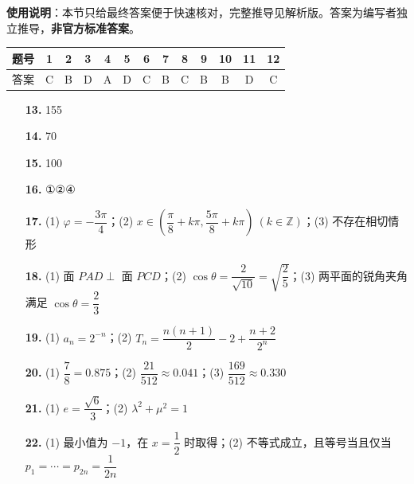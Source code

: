 
\begin{gknotice}
\textbf{使用说明}：本节只给最终答案便于快速核对，完整推导见解析版。答案为编写者独立推导，\textbf{非官方标准答案}。
\end{gknotice}

\begin{center}\begin{tabular}{ccccccccccccc}
\toprule
题号 & 1 & 2 & 3 & 4 & 5 & 6 & 7 & 8 & 9 & 10 & 11 & 12 \\
\midrule
答案 & C & B & D & A & D & C & B & C & B & B & D & C \\
\bottomrule
\end{tabular}\end{center}

\begin{itemize}[leftmargin=2.6em]
  \item[\textbf{13.}] 155
  \item[\textbf{14.}] 70
  \item[\textbf{15.}] 100
  \item[\textbf{16.}] ①②④
\end{itemize}

\begin{itemize}[leftmargin=2.6em]
  \item[\textbf{17.}] (1) $\varphi=-\dfrac{3\pi}{4}$；(2) $x\in\left(\dfrac{\pi}{8}+k\pi,\dfrac{5\pi}{8}+k\pi\right)\ (k\in\mathbb Z)$；(3) 不存在相切情形
  \item[\textbf{18.}] (1) 面 $PAD\perp$ 面 $PCD$；(2) $\cos\theta=\dfrac{2}{\sqrt{10}}=\sqrt{\dfrac25}$；(3) 两平面的锐角夹角满足 $\cos\theta=\dfrac23$
  \item[\textbf{19.}] (1) $a_n=2^{-n}$；(2) $T_n=\dfrac{n(n+1)}2-2+\dfrac{n+2}{2^n}$
  \item[\textbf{20.}] (1) $\dfrac78=0.875$；(2) $\dfrac{21}{512}\approx0.041$；(3) $\dfrac{169}{512}\approx0.330$
  \item[\textbf{21.}] (1) $e=\dfrac{\sqrt6}{3}$；(2) $\lambda^2+\mu^2=1$
  \item[\textbf{22.}] (1) 最小值为 $-1$，在 $x=\dfrac12$ 时取得；(2) 不等式成立，且等号当且仅当 $p_1=\cdots=p_{2n}=\dfrac1{2n}$
\end{itemize}
